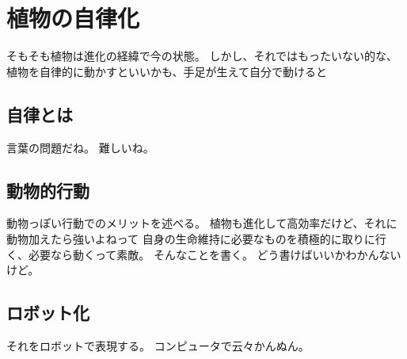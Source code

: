 \chapter{植物の自律化}
そもそも植物は進化の経緯で今の状態。
しかし、それではもったいない的な、植物を自律的に動かすといいかも、手足が生えて自分で動けると

\section{自律とは}
言葉の問題だね。
難しいね。
\section{動物的行動}
動物っぽい行動でのメリットを述べる。
植物も進化して高効率だけど、それに動物加えたら強いよねって
自身の生命維持に必要なものを積極的に取りに行く、必要なら動くって素敵。
そんなことを書く。
どう書けばいいかわかんないけど。
\section{ロボット化}
それをロボットで表現する。
コンピュータで云々かんぬん。
